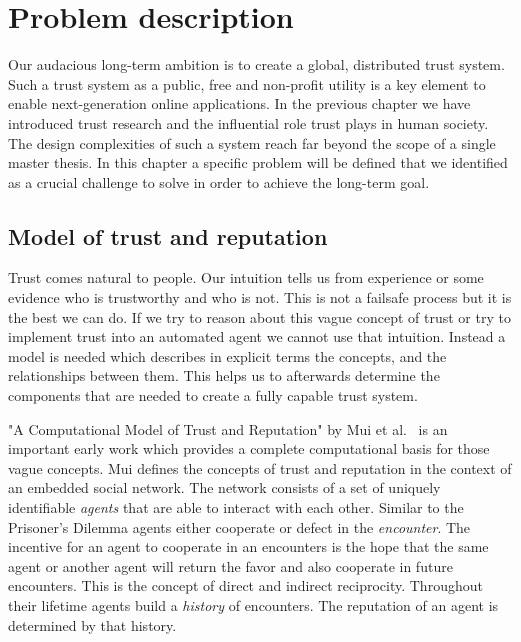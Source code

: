 \chapter{Problem description}
\label{chap:problem}

Our audacious long-term ambition is to create a global, distributed trust system. Such a trust system as a public, free and 
non-profit utility is a key element to enable next-generation online applications. In the 
previous chapter we have introduced trust research and the influential role trust plays in human 
society. The design complexities of such a system reach far beyond the scope of a single 
master thesis. In this chapter a specific problem will be defined that we identified as a crucial
challenge to solve in order to achieve the long-term goal.

\section{Model of trust and reputation}
Trust comes natural to people. Our intuition tells us from experience or some evidence who is 
trustworthy and who is not. This is not a failsafe process but it is the best we can do. If we try
to reason about this vague concept of trust or try to implement trust into an automated agent we
cannot use that intuition. Instead a model is needed which describes in explicit terms the 
concepts, and the relationships between them. This helps us to afterwards determine the components 
that are needed to create a fully capable trust system.

"A Computational Model of Trust and Reputation" by Mui et al.~\cite{mui2002computational} is an
important early work which provides a complete computational basis for those vague concepts. Mui
defines the concepts of trust and reputation in the context of an embedded social network. The 
network consists of a set of uniquely identifiable \textit{agents} that are able to interact with each other. 
Similar to the Prisoner's Dilemma agents either cooperate or defect in the \textit{encounter}. The incentive
for an agent to cooperate in an encounters is the hope that the same agent or another agent will
return the favor and also cooperate in future encounters. This is the concept of direct and indirect
reciprocity. Throughout their lifetime agents build a \textit{history} of encounters. The reputation 
of an agent is determined by that history. 

